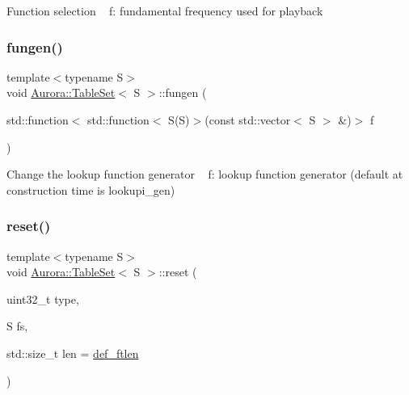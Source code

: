 Function selection ~\newline
f\+: fundamental frequency used for playback \mbox{\label{class_aurora_1_1_table_set_acd30711601ff6c362253c5d0d9582390}} 
\subsubsection{\texorpdfstring{fungen()}{fungen()}}
{\footnotesize\ttfamily template$<$typename S$>$ \\
void \hyperlink{class_aurora_1_1_table_set}{Aurora\+::\+Table\+Set}$<$ S $>$\+::fungen (\begin{DoxyParamCaption}\item[{std\+::function$<$ std\+::function$<$ S(S)$>$(const std\+::vector$<$ S $>$ \&)$>$}]{f }\end{DoxyParamCaption})\hspace{0.3cm}{\ttfamily [inline]}}

Change the lookup function generator ~\newline
f\+: lookup function generator (default at construction time is lookupi\+\_\+gen) \mbox{\label{class_aurora_1_1_table_set_ac2c945c49d53f60fd909dc771a6ff7e5}} 
\subsubsection{\texorpdfstring{reset()}{reset()}\hspace{0.1cm}{\footnotesize\ttfamily [1/2]}}
{\footnotesize\ttfamily template$<$typename S$>$ \\
void \hyperlink{class_aurora_1_1_table_set}{Aurora\+::\+Table\+Set}$<$ S $>$\+::reset (\begin{DoxyParamCaption}\item[{uint32\+\_\+t}]{type,  }\item[{S}]{fs,  }\item[{std\+::size\+\_\+t}]{len = {\ttfamily \hyperlink{namespace_aurora_a14dabfd9feedfa09c0e6f86d2627f006}{def\+\_\+ftlen}} }\end{DoxyParamCaption})\hspace{0.3cm}{\ttfamily [inline]}}


